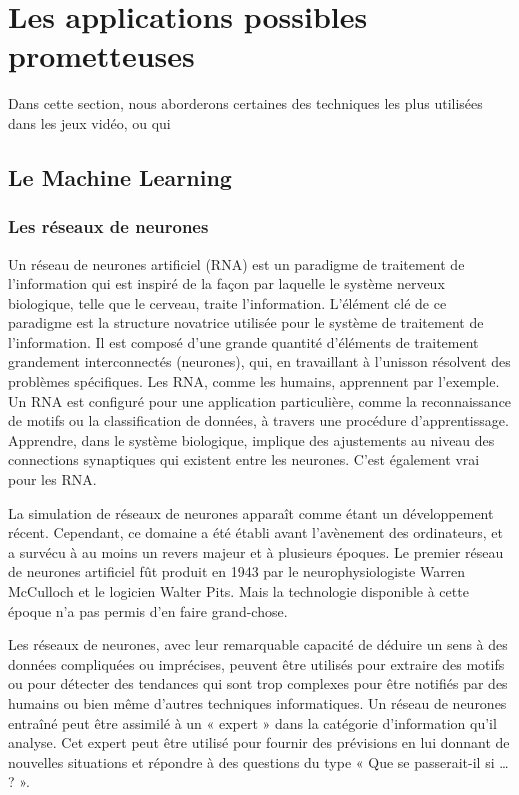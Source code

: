 \documentclass[a4paper, 12pt]{article} %
\begin{document}
\newpage
\section{Les applications possibles prometteuses}

Dans cette section, nous aborderons certaines des techniques les plus utilisées dans les jeux vidéo, ou qui 

\subsection{Le Machine Learning}

\subsubsection{Les réseaux de neurones}

Un réseau de neurones artificiel (RNA) est un paradigme de traitement de l’information qui est inspiré de la façon par laquelle le système nerveux biologique, telle que le cerveau, traite l’information. L’élément clé de ce paradigme est la structure novatrice utilisée pour le système de traitement de l’information. Il est composé d’une grande quantité d’éléments de traitement grandement interconnectés (neurones), qui, en travaillant à l’unisson résolvent des problèmes spécifiques. Les RNA, comme les humains, apprennent par l’exemple. Un RNA est configuré pour une application particulière, comme la reconnaissance de motifs ou la classification de données, à travers une procédure d’apprentissage. Apprendre, dans le système biologique, implique des ajustements au niveau des connections synaptiques qui existent entre les neurones. C’est également vrai pour les RNA.

La simulation de réseaux de neurones apparaît comme étant un développement récent. Cependant, ce domaine a été établi avant l’avènement des ordinateurs, et a survécu à au moins un revers majeur et à plusieurs époques. Le premier réseau de neurones artificiel fût produit en 1943 par le neurophysiologiste Warren McCulloch et le logicien Walter Pits. Mais la technologie disponible à cette époque n’a pas permis d’en faire grand-chose.

Les réseaux de neurones, avec leur remarquable capacité de déduire un sens à des données compliquées ou imprécises, peuvent être utilisés pour extraire des motifs ou pour détecter des tendances qui sont trop complexes pour être notifiés par des humains ou bien même d’autres techniques informatiques. Un réseau de neurones entraîné peut être assimilé à un « expert » dans la catégorie d’information qu’il analyse. Cet expert peut être utilisé pour fournir des prévisions en lui donnant de nouvelles situations et répondre à des questions du type « Que se passerait-il si … ? ».
\end{document}
